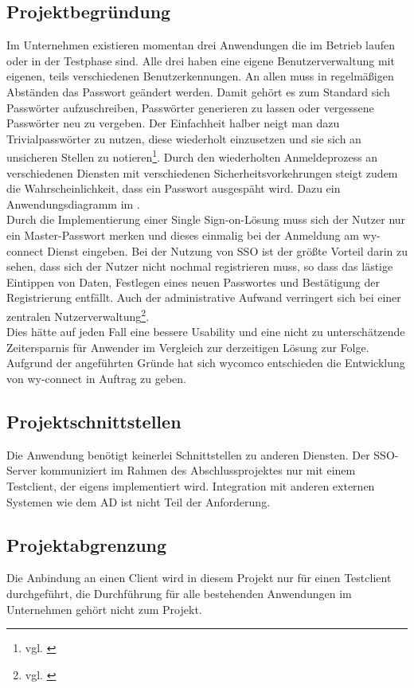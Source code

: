 \subsection{Projektbegründung} 
\label{sec:Projektbegruendung}
Im Unternehmen existieren momentan drei Anwendungen die im Betrieb laufen oder in der Testphase sind. Alle drei haben eine eigene Benutzerverwaltung mit eigenen, teils verschiedenen Benutzerkennungen. An allen muss in regelmäßigen Abständen das Passwort geändert werden. 
Damit gehört es zum Standard sich Passwörter aufzuschreiben, Passwörter generieren zu lassen oder vergessene Passwörter neu zu vergeben. Der Einfachheit halber neigt man dazu Trivialpasswörter zu nutzen, diese wiederholt einzusetzen und sie sich an unsicheren Stellen zu notieren\footnote{vgl. \cite{datenschutzbeauftragter}}. 
Durch den wiederholten Anmeldeprozess an verschiedenen Diensten mit verschiedenen Sicherheitsvorkehrungen steigt zudem die Wahrscheinlichkeit, dass ein Passwort ausgespäht wird. 
Dazu ein Anwendungsdiagramm im . \\
Durch die Implementierung einer Single Sign-on-Lösung muss sich der Nutzer nur ein Master-Passwort merken und dieses einmalig bei der Anmeldung am wy-connect Dienst eingeben. Bei der Nutzung von \ac{SSO} ist der größte Vorteil darin zu sehen, dass sich der Nutzer nicht nochmal registrieren muss, so dass das lästige Eintippen von Daten, Festlegen eines neuen Passwortes und Bestätigung der Registrierung entfällt. Auch der administrative Aufwand verringert sich bei einer zentralen Nutzerverwaltung\footnote{vgl. \cite{univention}}.\\
Dies hätte auf jeden Fall eine bessere Usability und eine nicht zu unterschätzende Zeitersparnis für Anwender im Vergleich zur derzeitigen Lösung zur Folge. 
Aufgrund der angeführten Gründe hat sich wycomco entschieden die Entwicklung von wy-connect in Auftrag zu geben.
\subsection{Projektschnittstellen} 
\label{sec:Projektschnittstellen}
Die Anwendung benötigt keinerlei Schnittstellen zu anderen Diensten. Der \ac{SSO}-Server kommuniziert im Rahmen des Abschlussprojektes nur mit einem Testclient, der eigens implementiert wird.
Integration mit anderen externen Systemen wie dem \ac{AD} ist nicht Teil der Anforderung.
\subsection{Projektabgrenzung} 
\label{sec:Projektabgrenzung}
Die Anbindung an einen Client wird in diesem Projekt nur für einen Testclient durchgeführt, die Durchführung für alle bestehenden Anwendungen im Unternehmen gehört nicht zum Projekt.